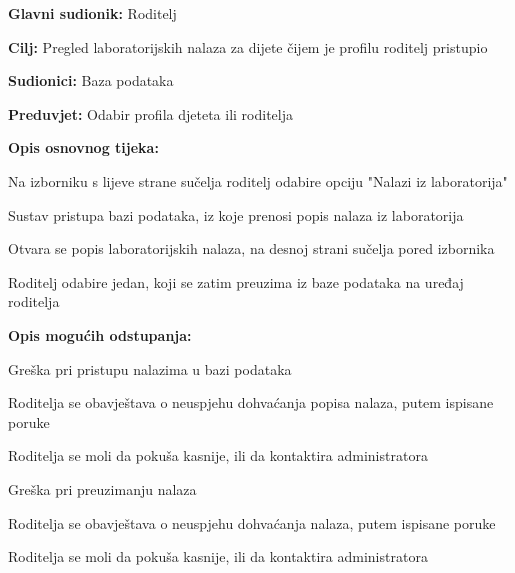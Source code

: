 					\noindent {}
					\begin{packed_item}
						
						\item \textbf{Glavni sudionik: }Roditelj
						\item  \textbf{Cilj:} Pregled laboratorijskih nalaza za dijete čijem je profilu roditelj pristupio
						\item  \textbf{Sudionici:} Baza podataka
						\item  \textbf{Preduvjet:} Odabir profila djeteta ili roditelja
						\item  \textbf{Opis osnovnog tijeka:}
						
						\item[] \begin{packed_enum}
							
							\item Na izborniku s lijeve strane sučelja roditelj odabire opciju "Nalazi iz laboratorija"
							\item Sustav pristupa bazi podataka, iz koje prenosi popis nalaza iz laboratorija
							\item Otvara se popis laboratorijskih nalaza, na desnoj strani sučelja pored izbornika
							\item Roditelj odabire jedan, koji se zatim preuzima iz baze podataka na uređaj roditelja
						\end{packed_enum}
						\item  \textbf{Opis mogućih odstupanja:}
						\item[] \begin{packed_item}
							
							\item[2.a] Greška pri pristupu nalazima u bazi podataka
							\item[] \begin{packed_enum}
								
								\item Roditelja se obavještava o neuspjehu dohvaćanja popisa nalaza, putem ispisane poruke
								\item Roditelja se moli da pokuša kasnije, ili da kontaktira administratora
								
							\end{packed_enum}
							\item[4.a] Greška pri preuzimanju nalaza
							\item[] \begin{packed_enum}
								
								\item Roditelja se obavještava o neuspjehu dohvaćanja nalaza, putem ispisane poruke
								\item Roditelja se moli da pokuša kasnije, ili da kontaktira administratora
								
							\end{packed_enum}
						\end{packed_item}
					\end{packed_item}
					
